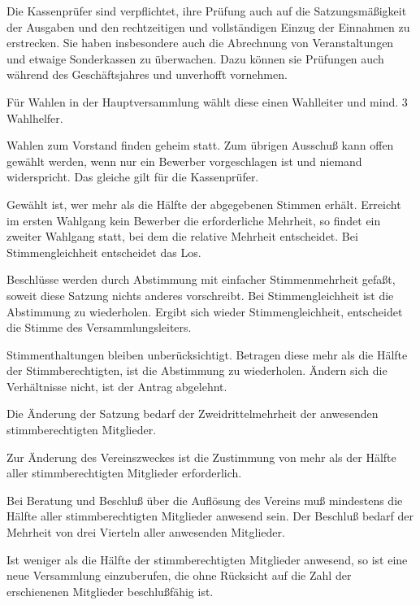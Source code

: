 \documentclass[10pt,a4paper,parskip=half]{scrartcl}
\begin{document}
\begin{contract}
\begin{multicols}{2}
\begin{enumerate}[label=\alph*),noitemsep]
\begin{enumerate}[label=\alph*),noitemsep]
    Die Kassenprüfer sind verpflichtet,
    ihre Prüfung auch auf die Satzungsmäßigkeit der Ausgaben und den rechtzeitigen und vollständigen Einzug der Einnahmen zu erstrecken.
    Sie haben insbesondere auch die Abrechnung von Veranstaltungen und etwaige Sonderkassen zu überwachen.
    Dazu können sie Prüfungen auch während des Geschäftsjahres und unverhofft vornehmen.
    
    \label{C:WahlenUndAbstimmungen}
    Für Wahlen in der Hauptversammlung wählt diese einen Wahlleiter und mind. 3 Wahlhelfer.
    
    Wahlen zum Vorstand finden geheim statt.
    Zum übrigen Ausschuß kann offen gewählt werden,
    wenn nur ein Bewerber vorgeschlagen ist und niemand widerspricht.
    Das gleiche gilt für die Kassenprüfer.
    
    Gewählt ist,
    wer mehr als die Hälfte der abgegebenen Stimmen erhält.
    Erreicht im ersten Wahlgang kein Bewerber die erforderliche Mehrheit,
    so findet ein zweiter Wahlgang statt,
    bei dem die relative Mehrheit entscheidet.
    Bei Stimmengleichheit entscheidet das Los.
    
    Beschlüsse werden durch Abstimmung mit einfacher Stimmenmehrheit gefaßt,
    soweit diese Satzung nichts anderes vorschreibt.
    Bei Stimmengleichheit ist die Abstimmung zu wiederholen.
    Ergibt sich wieder Stimmengleichheit,
    entscheidet die Stimme des Versammlungsleiters.
    
    Stimmenthaltungen bleiben unberücksichtigt.
    Betragen diese mehr als die Hälfte der Stimmberechtigten,
    ist die Abstimmung zu wiederholen.
    Ändern sich die Verhältnisse nicht,
    ist der Antrag abgelehnt.
    
    Die Änderung der Satzung bedarf der Zweidrittelmehrheit der anwesenden stimmberechtigten Mitglieder.
    
    Zur Änderung des Vereinszweckes ist die Zustimmung von mehr als der Hälfte aller stimmberechtigten Mitglieder erforderlich.
    
    Bei Beratung und Beschluß über die Auflösung des Vereins muß mindestens die Hälfte aller stimmberechtigten Mitglieder anwesend sein.
    Der Beschluß bedarf der Mehrheit von drei Vierteln aller anwesenden Mitglieder.
    
    Ist weniger als die Hälfte der stimmberechtigten Mitglieder anwesend,
    so ist eine neue Versammlung einzuberufen,
    die ohne Rücksicht auf die Zahl der erschienenen Mitglieder beschlußfähig ist.
    

\end{enumerate}
\end{enumerate}
\end{multicols}
\end{contract}
\end{document}
